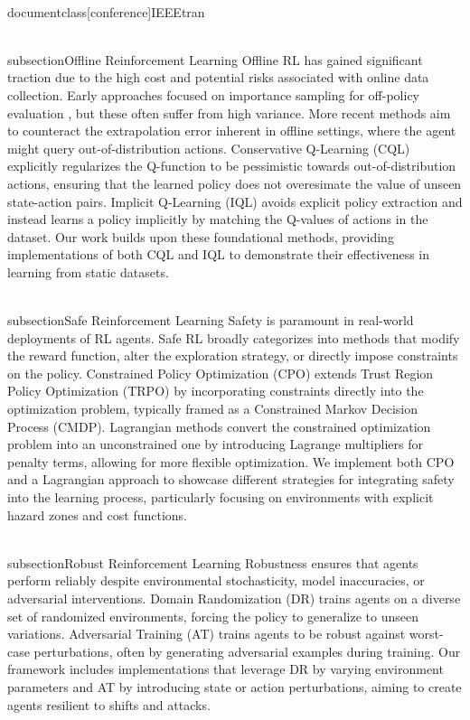 \\documentclass[conference]{IEEEtran}
\begin{document}
\\subsection{Offline Reinforcement Learning}
Offline RL has gained significant traction due to the high cost and potential risks associated with online data collection. Early approaches focused on importance sampling for off-policy evaluation \cite{precup2000eligibility}, but these often suffer from high variance. More recent methods aim to counteract the extrapolation error inherent in offline settings, where the agent might query out-of-distribution actions. Conservative Q-Learning (CQL) \cite{kumar2020conservative} explicitly regularizes the Q-function to be pessimistic towards out-of-distribution actions, ensuring that the learned policy does not overesimate the value of unseen state-action pairs. Implicit Q-Learning (IQL) \cite{kostrikov2021iql} avoids explicit policy extraction and instead learns a policy implicitly by matching the Q-values of actions in the dataset. Our work builds upon these foundational methods, providing implementations of both CQL and IQL to demonstrate their effectiveness in learning from static datasets.

\\subsection{Safe Reinforcement Learning}
Safety is paramount in real-world deployments of RL agents. Safe RL broadly categorizes into methods that modify the reward function, alter the exploration strategy, or directly impose constraints on the policy. Constrained Policy Optimization (CPO) \cite{achiam2017constrained} extends Trust Region Policy Optimization (TRPO) by incorporating constraints directly into the optimization problem, typically framed as a Constrained Markov Decision Process (CMDP). Lagrangian methods \cite{ding2020proximal} convert the constrained optimization problem into an unconstrained one by introducing Lagrange multipliers for penalty terms, allowing for more flexible optimization. We implement both CPO and a Lagrangian approach to showcase different strategies for integrating safety into the learning process, particularly focusing on environments with explicit hazard zones and cost functions.

\\subsection{Robust Reinforcement Learning}
Robustness ensures that agents perform reliably despite environmental stochasticity, model inaccuracies, or adversarial interventions. Domain Randomization (DR) \cite{tobin2017domain} trains agents on a diverse set of randomized environments, forcing the policy to generalize to unseen variations. Adversarial Training (AT) \cite{madry2017towards} trains agents to be robust against worst-case perturbations, often by generating adversarial examples during training. Our framework includes implementations that leverage DR by varying environment parameters and AT by introducing state or action perturbations, aiming to create agents resilient to shifts and attacks.
\end{document}
